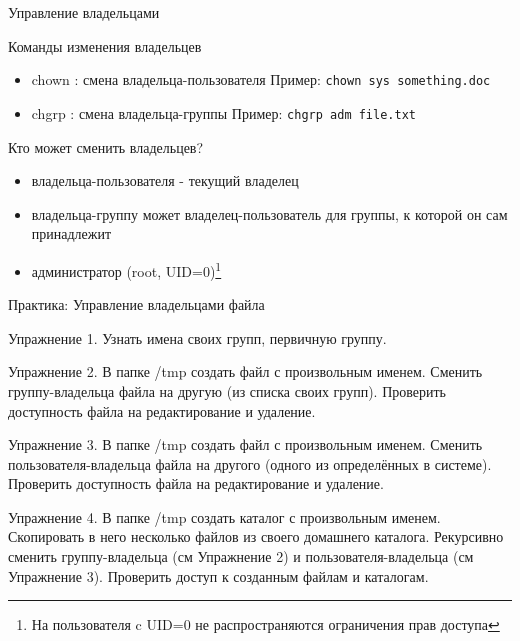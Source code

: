 \begin{frame}[fragile]{Управление владельцами}

  Команды изменения владельцев
  \begin{itemize} 
    \item \alert{chown} : смена владельца-пользователя \newline
      Пример: \verb+chown sys something.doc+
    \item \alert{chgrp} : смена владельца-группы \newline
      Пример: \verb+chgrp adm file.txt+
  \end{itemize} \pause

  Кто может сменить владельцев?
  \begin{itemize}
    \item владельца-пользователя  - текущий владелец
    \item владельца-группу может владелец-пользователь для группы, к которой он сам принадлежит
    \item  администратор (root, UID=0)\footnote{На пользователя c UID=0 не распространяются ограничения прав доступа} 
  \end{itemize} 
\end{frame}

\begin{frame}{Практика: Управление владельцами файла}

  \alert{Упражнение 1.} Узнать имена своих групп, первичную группу.\newline

  \alert{Упражнение 2.} В папке /tmp создать файл с произвольным именем. 
  Сменить группу-владельца файла на другую (из списка своих групп). 
  Проверить доступность файла на редактирование и удаление.\newline
 
  \alert{Упражнение 3.} В папке /tmp создать файл с произвольным именем.
  Сменить пользователя-владельца файла на другого (одного из определённых в системе).  Проверить доступность файла на редактирование и удаление. \newline

  \alert{Упражнение 4.} В папке /tmp создать каталог с произвольным именем. Скопировать в него несколько файлов из своего домашнего каталога. Рекурсивно сменить группу-владельца (см Упражнение 2) и пользователя-владельца (см Упражнение 3). Проверить доступ к созданным файлам и каталогам.

\end{frame}

